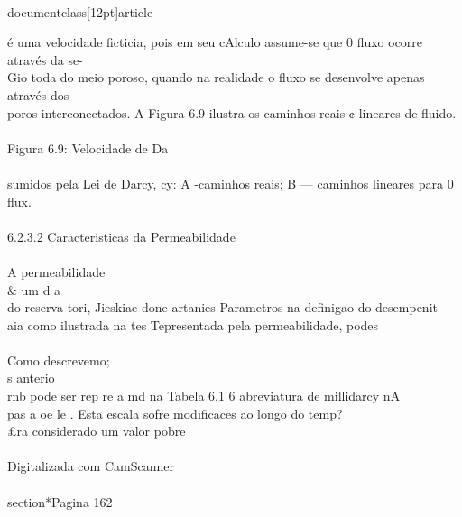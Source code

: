 \\documentclass[12pt]{article}
\begin{document}
é uma velocidade ficticia, pois em seu cAlculo assume-se que 0 fluxo ocorre através da se-\\
Gio toda do meio poroso, quando na realidade o fluxo se desenvolve apenas através dos\\
poros interconectados. A Figura 6.9 ilustra os caminhos reais ¢ lineares de fluido.\\
\\
Figura 6.9: Velocidade de Da\\
\\
sumidos pela Lei de Darcy, cy: A -caminhos reais; B — caminhos lineares para 0 flux.\\
\\
6.2.3.2 Caracteristicas da Permeabilidade\\
\\
A permeabilidade \\& um d a\\
do reserva tori, Jieskiae done artanies Parametros na definigao do desempenit\\
aia como ilustrada na tes Tepresentada pela permeabilidade, podes\\
\\
Como descrevemo;\\
s anterio\\
rnb pode ser rep re a md na Tabela 6.1 6 abreviatura de millidarcy nA\\
pas a oe le . Esta escala sofre modificaces ao longo do temp?\\
£ra considerado um valor pobre\\
\\
Digitalizada com CamScanner\\

\\section*{Pagina 162}
\end{document}

